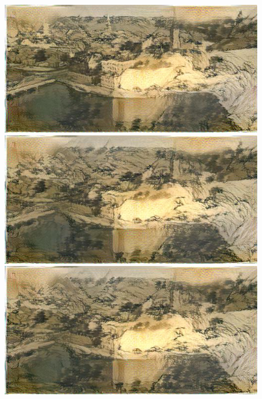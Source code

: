 \documentclass[runningheads]{llncs}
\begin{document}
\begin{figure}[h]
{\begin{minipage}[b]{0.15\textwidth}
\includegraphics[width=1.1\textwidth]{neural_style_transfer/img/fu_stockholm_output/fu_stockholm_conv3-2_1e-2.jpg} \\
\includegraphics[width=1.1\textwidth]{neural_style_transfer/img/fu_stockholm_output/fu_stockholm_conv3-2_1e-3.jpg} \\
\includegraphics[width=1.1\textwidth]{neural_style_transfer/img/fu_stockholm_output/fu_stockholm_conv3-2_1e-4.jpg}
\end{minipage}
}
\end{figure}
\end{document}
